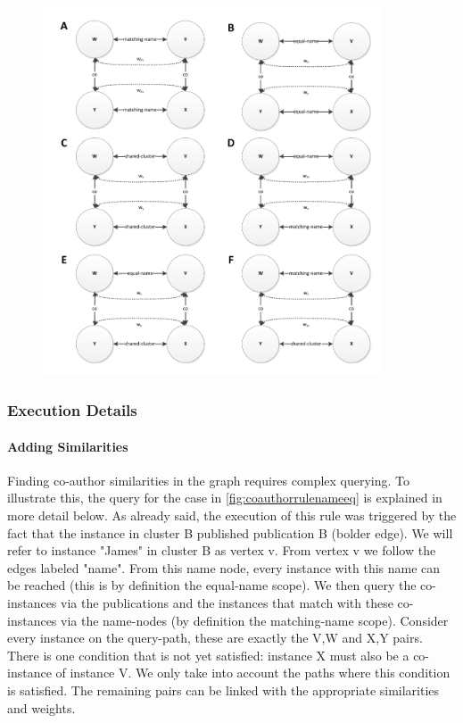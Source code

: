 \begin{figure}[htb]
	\centering
		\includegraphics[width=0.9\textwidth]{fig/coauthorrulecases}
	\caption{}
	\label{fig:coauthorrulecases}
\end{figure}

\subsubsection{Execution Details}

\paragraph{Adding Similarities} Finding co-author similarities in the graph requires complex querying. To illustrate this, the query for the case in \autoref{fig:coauthorrulenameeq} is explained in more detail below. As already said, the execution of this rule was triggered by the fact that the instance in cluster B published publication B (bolder edge). We will refer to instance "James" in cluster B as vertex v. From vertex v we follow the edges labeled "name". From this name node, every instance with this name can be reached (this is by definition the equal-name scope). We then query the co-instances via the publications and the instances that match with these co-instances via the name-nodes (by definition the matching-name scope). Consider every instance on the query-path, these are exactly the V,W and X,Y pairs. There is one condition that is not yet satisfied: instance X must also be a co-instance of instance V. We only take into account the paths where this condition is satisfied. The remaining pairs can be linked with the appropriate similarities and weights.

